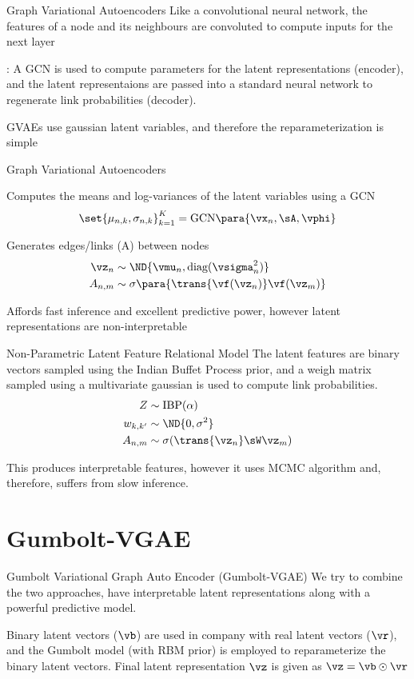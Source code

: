 \documentclass[9pt]{beamer}
\begin{document}
\begin{frame}{Graph Variational Autoencoders}
	 Like a convolutional neural network, the features of a node and its neighbours are convoluted to compute inputs for the next layer

	: A GCN is used to compute parameters for the latent representations (encoder), and the latent representaions are passed into a standard neural network to regenerate link probabilities (decoder).

	GVAEs use gaussian latent variables, and therefore the reparameterization is simple
\end{frame}

\begin{frame}{Graph Variational Autoencoders}

	 Computes the means and log-variances of the latent variables using a GCN
	\begin{align*}
		\set{\mu_{n,k}, \sigma_{n,k}}_{k = 1}^K = \text{GCN}\para{\vx_n, \sA, \vphi}
	\end{align*}

	 Generates edges/links (A) between nodes
	\begin{align*}
		\vz_n &\sim \ND{\vmu_n, \text{diag}(\vsigma_n^2)} \\
		A_{n,m} &\sim \sigma\para{\trans{\vf(\vz_n)} \vf(\vz_m)}
	\end{align*}

	Affords fast inference and excellent predictive power, however latent representations are non-interpretable

\end{frame}

\begin{frame}{Non-Parametric Latent Feature Relational Model}
	The latent features are binary vectors sampled using the Indian Buffet Process prior, and a weigh matrix sampled using a multivariate gaussian is used to compute link probabilities.
	\begin{align*}
		Z &\sim \text{IBP}(\alpha) \\
		w_{k,k'} &\sim \ND{0, \sigma^2} \\
		A_{n, m} &\sim \sigma(\trans{\vz_n} \sW \vz_m)
	\end{align*}

	This produces interpretable features, however it uses MCMC algorithm and, therefore, suffers from slow inference.
\end{frame}

\section{Gumbolt-VGAE}
\begin{frame}{Gumbolt Variational Graph Auto Encoder (Gumbolt-VGAE)}
	We try to combine the two approaches, \ie have interpretable latent representations along with a powerful predictive model. 

	Binary latent vectors ($\vb$) are used in company with real latent vectors ($\vr$), and the Gumbolt model (with RBM prior) is employed to reparameterize the binary latent vectors. Final latent representation $\vz$ is given as $\vz = \vb \odot \vr$
\end{frame}
\end{document}

